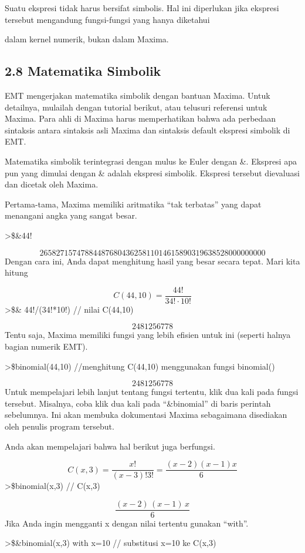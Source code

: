 \documentclass[
]{book}
\begin{document}
Suatu ekspresi tidak harus bersifat simbolis. Hal ini diperlukan jika ekspresi tersebut mengandung fungsi-fungsi yang hanya diketahui

dalam kernel numerik, bukan dalam Maxima.

\subsection{2.8 Matematika Simbolik}\label{matematika-simbolik}

EMT mengerjakan matematika simbolik dengan bantuan Maxima. Untuk detailnya, mulailah dengan tutorial berikut, atau telusuri referensi untuk Maxima. Para ahli di Maxima harus memperhatikan bahwa ada perbedaan sintaksis antara sintaksis asli Maxima dan sintaksis default ekspresi simbolik di EMT.

Matematika simbolik terintegrasi dengan mulus ke Euler dengan \&. Ekspresi apa pun yang dimulai dengan \& adalah ekspresi simbolik. Ekspresi tersebut dievaluasi dan dicetak oleh Maxima.

Pertama-tama, Maxima memiliki aritmatika ``tak terbatas'' yang dapat menangani angka yang sangat besar.

\textgreater\$\&44!

\[2658271574788448768043625811014615890319638528000000000\]Dengan cara ini, Anda dapat menghitung hasil yang besar secara tepat. Mari kita hitung

\[C(44,10) = \frac{44!}{34! \cdot 10!}\]\textgreater\$\& 44!/(34!*10!) // nilai C(44,10)

\[2481256778\]Tentu saja, Maxima memiliki fungsi yang lebih efisien untuk ini (seperti halnya bagian numerik EMT).

\textgreater\$binomial(44,10) //menghitung C(44,10) menggunakan fungsi binomial()

\[2481256778\]Untuk mempelajari lebih lanjut tentang fungsi tertentu, klik dua kali pada fungsi tersebut. Misalnya, coba klik dua kali pada ``\&binomial'' di baris perintah sebelumnya. Ini akan membuka dokumentasi Maxima sebagaimana disediakan oleh penulis program tersebut.

Anda akan mempelajari bahwa hal berikut juga berfungsi.

\[C(x,3)=\frac{x!}{(x-3)!3!}=\frac{(x-2)(x-1)x}{6}\]\textgreater\$binomial(x,3) // C(x,3)

\[\frac{\left(x-2\right)\,\left(x-1\right)\,x}{6}\]Jika Anda ingin mengganti x dengan nilai tertentu gunakan ``with''.

\textgreater\$\&binomial(x,3) with x=10 // substitusi x=10 ke C(x,3)
\end{document}
